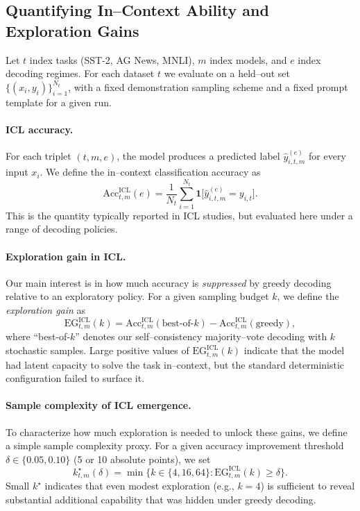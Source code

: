 \subsection{Quantifying In--Context Ability and Exploration Gains}
\label{subsec:icl-metrics}

Let $t$ index tasks (SST-2, AG News, MNLI), $m$ index models, and $e$ index
decoding regimes. For each dataset $t$ we evaluate on a held--out set
$\{(x_i,y_i)\}_{i=1}^{N_t}$, with a fixed demonstration sampling scheme and a
fixed prompt template for a given run.

\paragraph{ICL accuracy.}
For each triplet $(t,m,e)$, the model produces a predicted label
$\hat{y}^{(e)}_{i,t,m}$ for every input $x_i$. We define the in--context
classification accuracy as
\[
\mathrm{Acc}^{\text{ICL}}_{t,m}(e)
= \frac{1}{N_t} \sum_{i=1}^{N_t}
  \mathbf{1}\big[ \hat{y}^{(e)}_{i,t,m} = y_{i,t} \big].
\]
This is the quantity typically reported in ICL studies, but evaluated here
under a range of decoding policies.

\paragraph{Exploration gain in ICL.}
Our main interest is in how much accuracy is \emph{suppressed} by greedy
decoding relative to an exploratory policy. For a given sampling budget
$k$, we define the \emph{exploration gain} as
\[
\mathrm{EG}^{\text{ICL}}_{t,m}(k)
= \mathrm{Acc}^{\text{ICL}}_{t,m}(\text{best-of-}k)
- \mathrm{Acc}^{\text{ICL}}_{t,m}(\text{greedy}),
\]
where ``best-of-$k$'' denotes our self--consistency majority--vote decoding with
$k$ stochastic samples. Large positive values of
$\mathrm{EG}^{\text{ICL}}_{t,m}(k)$ indicate that the model had latent
capacity to solve the task in--context, but the standard deterministic
configuration failed to surface it.

\paragraph{Sample complexity of ICL emergence.}
To characterize how much exploration is needed to unlock these gains, we define
a simple sample complexity proxy. For a given accuracy improvement threshold
$\delta\in\{0.05, 0.10\}$ (5 or 10 absolute points), we set
\[
k^{\star}_{t,m}(\delta)
= \min\big\{ k\in\{4,16,64\} :
\mathrm{EG}^{\text{ICL}}_{t,m}(k) \ge \delta \big\}.
\]
Small $k^{\star}$ indicates that even modest exploration (e.g., $k{=}4$) is
sufficient to reveal substantial additional capability that was hidden under
greedy decoding.

